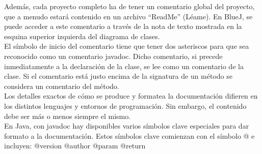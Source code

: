 \documentclass[11pt,a4paper]{article}
\begin{document}
Además, cada proyecto completo ha de tener un comentario global del proyecto, que a menudo
estará contenido en un archivo “ReadMe” (Léame). En BlueJ, se puede acceder a este comentario
a través de la nota de texto mostrada en la esquina superior izquierda del diagrama de clases.\\
El símbolo de inicio del comentario tiene que tener dos asteriscos para que sea reconocido como
un comentario javadoc. Dicho comentario, si precede inmediatamente a la declaración de la
clase, se lee como un comentario de la clase. Si el comentario está justo encima de la signatura de
un método se considera un comentario del método.\\
Los detalles exactos de cómo se produce y formatea la documentación difieren en los distintos
lenguajes y entornos de programación. Sin embargo, el contenido debe ser más o menos siempre
el mismo.\\
En Java, con javadoc hay disponibles varios símbolos clave especiales para dar formato a la
documentación. Estos símbolos clave comienzan con el símbolo @ e incluyen:
@version
@author
@param
@return
\end{document}
